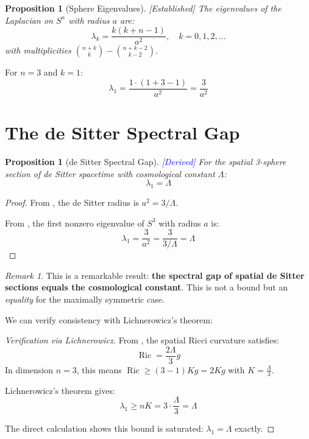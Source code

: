 \documentclass[11pt,a4paper]{article}
\theoremstyle{plain}
\newtheorem{proposition}[theorem]{Proposition}
\theoremstyle{definition}
\theoremstyle{remark}
\newtheorem{remark}[theorem]{Remark}
\newcommand{\Ric}{\operatorname{Ric}}
\newcommand{\established}{\textcolor{green!50!black}{[Established]}}
\newcommand{\derived}{\textcolor{blue}{[Derived]}}
\begin{document}
\begin{proposition}[Sphere Eigenvalues] \established
\label{prop:sphere}
The eigenvalues of the Laplacian on $S^n$ with radius $a$ are:
\[
\lambda_k = \frac{k(k+n-1)}{a^2}, \quad k = 0, 1, 2, \ldots
\]
with multiplicities $\binom{n+k}{k} - \binom{n+k-2}{k-2}$.
\end{proposition}

For $n = 3$ and $k = 1$:
\[
\lambda_1 = \frac{1 \cdot (1 + 3 - 1)}{a^2} = \frac{3}{a^2}
\]

\section{The de Sitter Spectral Gap}

\begin{proposition}[de Sitter Spectral Gap] \derived
\label{prop:desitter_gap}
For the spatial 3-sphere section of de Sitter spacetime with cosmological constant $\Lambda$:
\[
\boxed{\lambda_1 = \Lambda}
\]
\end{proposition}

\begin{proof}
From , the de Sitter radius is $a^2 = 3/\Lambda$.

From , the first nonzero eigenvalue of $S^3$ with radius $a$ is:
\[
\lambda_1 = \frac{3}{a^2} = \frac{3}{3/\Lambda} = \Lambda
\]
\end{proof}

\begin{remark}
This is a remarkable result: \textbf{the spectral gap of spatial de Sitter sections equals the cosmological constant}. This is not a bound but an \emph{equality} for the maximally symmetric case.
\end{remark}

We can verify consistency with Lichnerowicz's theorem:

\begin{proof}[Verification via Lichnerowicz]
From , the spatial Ricci curvature satisfies:
\[
\Ric = \frac{2\Lambda}{3} g
\]
In dimension $n = 3$, this means $\Ric \geq (3-1)Kg = 2Kg$ with $K = \frac{\Lambda}{3}$.

Lichnerowicz's theorem gives:
\[
\lambda_1 \geq nK = 3 \cdot \frac{\Lambda}{3} = \Lambda
\]

The direct calculation shows this bound is saturated: $\lambda_1 = \Lambda$ exactly.
\end{proof}
\end{document}
